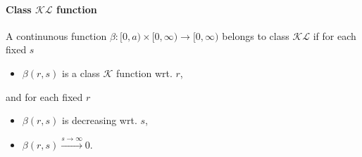 \paragraph{Class $\mathcal{KL}$ function}
A continunous function $\beta : [0,a) \times [0,\infty) \rightarrow [0,\infty)$ belongs to class $\mathcal{KL}$ if for each fixed $s$
\begin{itemize}
	\item $\beta(r,s)$ is a class $\mathcal{K}$ function wrt. $r$,
\end{itemize}
and for each fixed $r$
\begin{itemize}
	\item $\beta(r,s)$ is decreasing wrt. $s$,
	\item $\beta(r,s) \xrightarrow{s \rightarrow \infty} 0$.
\end{itemize}
